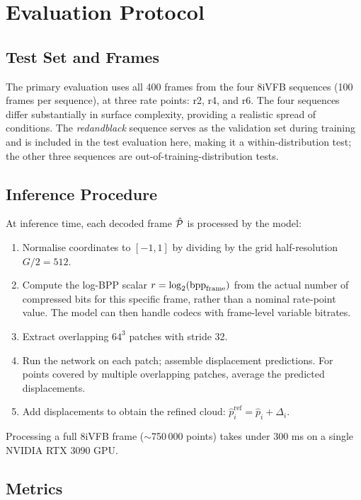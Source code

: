 \section{Evaluation Protocol}
\label{sec:eval-protocol}

\subsection{Test Set and Frames}

The primary evaluation uses all 400 frames from the four 8iVFB sequences
(100 frames per sequence), at three rate points: r2, r4, and r6.
The four sequences differ substantially in surface complexity, providing a
realistic spread of conditions.
The \textit{redandblack} sequence serves as the validation set during training
and is included in the test evaluation here, making it a within-distribution
test; the other three sequences are out-of-training-distribution tests.

\subsection{Inference Procedure}

At inference time, each decoded frame $\hat{\mathcal{P}}$ is processed by the model:
\begin{enumerate}
  \item Normalise coordinates to $[-1, 1]$ by dividing by the grid half-resolution
    $G/2 = 512$.
  \item Compute the log-BPP scalar $r = \log_2(\mathrm{bpp}_{\text{frame}})$ from the
    actual number of compressed bits for this specific frame, rather than a
    nominal rate-point value.
    The model can then handle codecs with frame-level variable bitrates.
  \item Extract overlapping $64^3$ patches with stride 32.
  \item Run the network on each patch; assemble displacement predictions.
    For points covered by multiple overlapping patches, average the predicted
    displacements.
  \item Add displacements to obtain the refined cloud:
    $\hat{p}^{\text{ref}}_i = \hat{p}_i + \Delta_i$.
\end{enumerate}
Processing a full 8iVFB frame ($\sim$750\,000 points) takes under 300 ms on
a single NVIDIA RTX 3090 GPU.

\subsection{Metrics}

